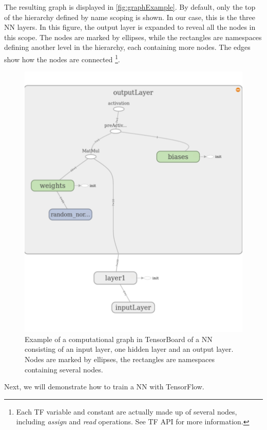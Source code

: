 \documentclass[twoside,english]{uiofysmaster}
\begin{document}
The resulting graph is displayed in \autoref{fig:graphExample}. 
By default, only the top of the hierarchy defined by name scoping is shown. In our case, this
is the three NN layers. In this figure, the output layer is expanded to reveal all the nodes in this scope. 
The nodes are marked by ellipses, while the rectangles are namespaces defining another level in the hierarchy, 
each containing more nodes. The edges show how the nodes are connected%
\footnote{Each TF variable and constant are actually made up of several nodes, including \textit{assign} and 
\textit{read} operations. See TF API for more information.}.
\begin{figure}[H]
\centering
  \includegraphics[width=0.7\linewidth]{Figures/Implementation/tensorBoardExample.pdf}
  \caption{Example of a computational graph in TensorBoard of a NN consisting of an input layer, one 
	   hidden layer and an output layer. Nodes are marked by ellipses, the rectangles are namespaces
	   containing several nodes.} 
  \label{fig:graphExample}
\end{figure}
\noindent Next, we will demonstrate how to train a NN with TensorFlow. 
\end{document}
